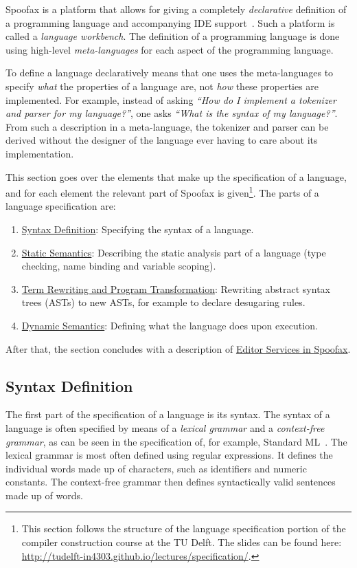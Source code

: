Spoofax is a platform that allows for giving a completely
\emph{declarative} definition of a programming language and accompanying
IDE support~\cite{Kats10a}. Such a platform is called a \emph{language
workbench}. The definition of a programming language is done using
high-level \emph{meta-languages} for each aspect of the programming
language.

To define a language declaratively means that one uses the
meta-languages to specify \emph{what} the properties of a language are, not
\emph{how} these properties are implemented. For example, instead of asking
\emph{​``How do I implement a tokenizer and parser for my language?''​}, one
asks \emph{​``What is the syntax of my language?''​}. From such a description
in a meta-language, the tokenizer and parser can be derived without
the designer of the language ever having to care about its
implementation.

This section goes over the elements that make up the specification of
a language, and for each element the relevant part of Spoofax is
given\footnote{This section follows the structure of the
language specification portion of the compiler construction course at
the TU Delft. The slides can be found here:
\url{http://tudelft-in4303.github.io/lectures/specification/}.}. The parts
of a language specification are:

\begin{enumerate}
\item \hyperref[sec:syntax-def]{Syntax Definition}: Specifying the syntax of a language.
\item \hyperref[sec:static-analysis]{Static Semantics}: Describing the static analysis part of a
language (type checking, name binding and variable scoping).
\item \hyperref[sec:term-rewrite]{Term Rewriting and Program Transformation}: Rewriting abstract
syntax trees (ASTs) to new ASTs, for example to declare desugaring
rules.
\item \hyperref[sec:dynamic-semantics]{Dynamic Semantics}: Defining what the language does upon execution.
\end{enumerate}

After that, the section concludes with a description of \hyperref[sec:editor-serv]{Editor
Services in Spoofax}.
\subsection{Syntax Definition}
\label{sec:syntax-def}
The first part of the specification of a language is its syntax. The
syntax of a language is often specified by means of a \emph{lexical
grammar} and a \emph{context-free grammar}, as can be seen in the
specification of, for example, Standard ML~\cite{Milner97}. The
lexical grammar is most often defined using regular expressions. It
defines the individual words made up of characters, such as
identifiers and numeric constants. The context-free grammar then
defines syntactically valid sentences made up of words.

